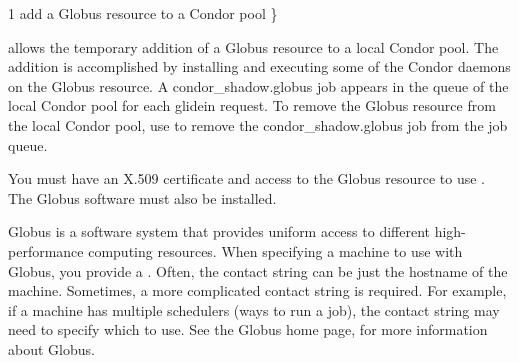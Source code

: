 \begin{ManPage}{\label{man-condor-glidein}}{1}
{add a Globus resource to a Condor pool}
\Synopsis {}
 \} \Bar {}


\Description

 allows the temporary addition of a Globus resource to
a local Condor pool.
The addition is accomplished by installing and executing some of the Condor
daemons on the Globus resource.
A condor\_shadow.globus job appears in the queue of the local
Condor pool for each glidein request.
To remove the Globus resource from the local Condor pool,
use  to remove the condor\_shadow.globus job from
the job queue.

You must have an X.509 certificate and access
to the Globus resource to use .
The Globus software must also be installed.

Globus is a software system that provides uniform access to
different high-performance computing resources.
When specifying a machine to use with Globus,
you provide a .
Often, the contact string can be just the hostname of the machine.
Sometimes, a more complicated contact string is required.
For example, if a machine has multiple schedulers (ways to run a job),
the contact string may need to specify which to use.
See the Globus home page,  for more
information about Globus.


\end{ManPage}

